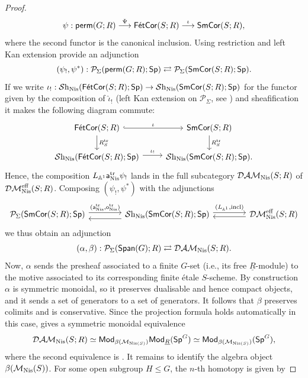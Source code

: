 \documentclass[reqno]{amsart}
\numberwithin{equation}{section}\theoremstyle{thms}
\theoremstyle{defn}
\newcommand{\bA}{\mathbb{A}}
\newcommand{\cM}{\mathcal{M}}
\newcommand{\cP}{\mathcal{P}}
\newcommand{\tn}[1]{\textnormal{#1}}
\newcommand{\tsf}[1]{\textsf{\textup{#1}}}
\newcommand{\mcal}[1]{\mathcal{#1}}
\newcommand{\underl}[1]{\underline{#1}}
\newcommand{\psigma}{\cP_{\Sigma}}
\newcommand{\sheaves}{\mcal{S}\tn{h}}
\newcommand{\Mod}{\tsf{Mod}}
\newcommand{\Spans}{\tsf{Span}}
\newcommand{\spec}{\tsf{Sp}}
\newcommand{\specg}{\tsf{Sp}^G}
\newcommand{\permgr}{\tsf{perm}(G;R)}
\newcommand{\corsms}[1]{\tsf{SmCor}(S;#1)}
\newcommand{\corfets}[1]{\tsf{FétCor}(S;#1)}
\begin{document}
\begin{proof}
$$\psi: \permgr \stackrel{\Psi}{\longrightarrow} \corfets{R} \stackrel{\iota}{\longrightarrow} \corsms{R},$$
where the second functor is the canonical inclusion. Using \cite[Proposition 3.3.2]{chll24} restriction and left Kan extension provide an adjunction
$$(\psi_!, \psi^*): \psigma(\permgr;\spec) \rightleftarrows \psigma(\corsms{R};\spec).$$
If we write $\iota_!: \sheaves_{\tn{Nis}}(\corfets{R};\spec) \to \sheaves_{\tn{Nis}}(\corsms{R};\spec)$ for the functor given by the composition of $\hat{\iota}_!$ (left Kan extension on $\psigma$, see ) and sheafification it makes the following diagram commute:
\[\begin{tikzcd}
	\corfets{R} & \corsms{R} \\
	{\sheaves_{\tn{Nis}}(\corfets{R};\spec)} & {\sheaves_{\tn{Nis}}(\corsms{R};\spec).}
	\arrow["\iota", hook, from=1-1, to=1-2]
	\arrow["R^{\tn{tr}}_S", from=1-1, to=2-1]
	\arrow["R^{\tn{tr}}_S", from=1-2, to=2-2]
	\arrow["{\iota_!}", shift left, from=2-1, to=2-2]
\end{tikzcd}\]
Hence, the composition $L_{\bA^1}\tsf{a}_{\tn{Nis}}^{\tn{tr}}\psi_!$ lands in the full subcategory $\mcal{DAM}_{\tn{Nis}}(S;R)$ of $\mcal{DM}_{\tn{Nis}}^{\tn{eff}}(S;R)$. Composing $(\psi_!, \psi^*)$ with the adjunctions 
\[\begin{tikzcd}[column sep=1.4cm]
	{\psigma(\corsms{R};\spec)} & {\sheaves_{\tn{Nis}}(\corsms{R};\spec)} & {\mcal{DM}_{\tn{Nis}}^{\tn{eff}}(S;R)}
	\arrow["{(\tsf{a}_{\tn{Nis}}^{\tn{tr}},\tsf{o}_{\tn{Nis}}^{\tn{tr}})}", shift left, from=1-1, to=1-2]
	\arrow[shift left=2, from=1-2, to=1-1]
	\arrow["{(L_{\bA^1},\tn{incl})}", shift left, from=1-2, to=1-3]
	\arrow[shift left, from=1-3, to=1-2]
\end{tikzcd}\]
we thus obtain an adjunction
$$(\alpha, \beta): \psigma(\Spans(G);R) \rightleftarrows \mcal{DAM}_{\tn{Nis}}(S;R).$$
Now, $\alpha$ sends the presheaf associated to a finite $G$-set (i.e., its free $\underl{R}$-module) to the motive associated to its corresponding finite étale $S$-scheme. By construction $\alpha$ is symmetric monoidal, so it preserves dualisable and hence compact objects, and it sends a set of generators to a set of generators. It follows that $\beta$ preserves colimits and is conservative. Since the projection formula holds automatically in this case, \cite[Proposition 5.29]{mnn17} gives a symmetric monoidal equivalence
$$\mcal{DAM}_{\tn{Nis}}(S;R) \simeq \Mod_{\beta(\cM_{\tn{Nis}(S)})}\Mod_{\underl{R}}(\specg) \simeq \Mod_{\beta(\cM_{\tn{Nis}(S)})}(\specg),$$
where the second equivalence is \cite[Corollary 3.4.1.9]{lur17}. It remains to identify the algebra object $\beta(\cM_{\tn{Nis}}(S))$. For some open subgroup $H \leq G$, the $n$-th homotopy is given by

\end{proof}
\end{document}
